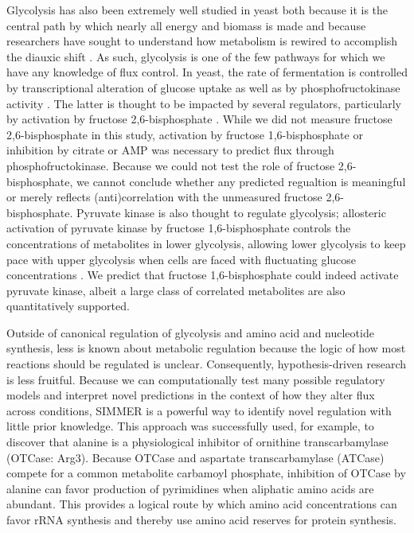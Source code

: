 Glycolysis has also been extremely well studied in yeast both because it is the central path by which nearly all energy and biomass is made and because researchers have sought to understand how metabolism is rewired to accomplish the diauxic shift \cite{Zampar:2013fr}. As such, glycolysis is one of the few pathways for which we have any knowledge of flux control.  In yeast, the rate of fermentation is controlled by transcriptional alteration of glucose uptake as well as by phosphofructokinase activity \cite{Cortassa:1994is, Pritchard:2002ft}.  The latter is thought to be impacted by several regulators, particularly by activation by fructose 2,6-bisphosphate \cite{Cortassa:1994is, vanEunen:2012cr}. While we did not measure fructose 2,6-bisphosphate in this study, activation by fructose 1,6-bisphosphate or inhibition by citrate or AMP was necessary to predict flux through phosphofructokinase. Because we could not test the role of fructose 2,6-bisphosphate, we cannot conclude whether any predicted regualtion is meaningful or merely reflects (anti)correlation with the unmeasured fructose 2,6-bisphosphate. Pyruvate kinase is also thought to regulate glycolysis; allosteric activation of pyruvate kinase by fructose 1,6-bisphosphate controls the concentrations of metabolites in lower glycolysis, allowing lower glycolysis to keep pace with upper glycolysis when cells are faced with fluctuating glucose concentrations \cite{Xu:2012gg}. We predict that fructose 1,6-bisphosphate could indeed activate pyruvate kinase, albeit a large class of correlated metabolites are also quantitatively supported.

Outside of canonical regulation of glycolysis and amino acid and nucleotide synthesis, less is known about metabolic regulation because the logic of how most reactions should be regulated is unclear. Consequently, hypothesis-driven research is less fruitful. Because we can computationally test many possible regulatory models and interpret novel predictions in the context of how they alter flux across conditions, SIMMER is a powerful way to identify novel regulation with little prior knowledge.  This approach was successfully used, for example, to discover that alanine is a physiological inhibitor of ornithine transcarbamylase (OTCase: Arg3).  Because OTCase and aspartate transcarbamylase (ATCase) compete for a common metabolite carbamoyl phosphate, inhibition of OTCase by alanine can favor production of pyrimidines when aliphatic amino acids are abundant.  This provides a logical route by which amino acid concentrations can favor rRNA synthesis and thereby use amino acid reserves for protein synthesis.  

